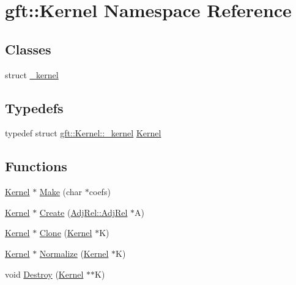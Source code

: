 \hypertarget{namespacegft_1_1Kernel}{\section{gft\-:\-:Kernel Namespace Reference}
\label{namespacegft_1_1Kernel}
}
\subsection*{Classes}
\begin{DoxyCompactItemize}
\item 
struct \hyperlink{structgft_1_1Kernel_1_1__kernel}{\-\_\-kernel}
\end{DoxyCompactItemize}
\subsection*{Typedefs}
\begin{DoxyCompactItemize}
\item 
typedef struct \hyperlink{structgft_1_1Kernel_1_1__kernel}{gft\-::\-Kernel\-::\-\_\-kernel} \hyperlink{namespacegft_1_1Kernel_a88f2f8f5778d1d17a52a77e1f2518ab3}{Kernel}
\end{DoxyCompactItemize}
\subsection*{Functions}
\begin{DoxyCompactItemize}
\item 
\hyperlink{namespacegft_1_1Kernel_a88f2f8f5778d1d17a52a77e1f2518ab3}{Kernel} $\ast$ \hyperlink{namespacegft_1_1Kernel_aaaf4b10ecdc7daf68da848e3b71168a0}{Make} (char $\ast$coefs)
\item 
\hyperlink{namespacegft_1_1Kernel_a88f2f8f5778d1d17a52a77e1f2518ab3}{Kernel} $\ast$ \hyperlink{namespacegft_1_1Kernel_a2a5aad45a71c7de42fe5880de93ed74d}{Create} (\hyperlink{namespacegft_1_1AdjRel_a832ff5521af7a9801ff18dc3ae629b68}{Adj\-Rel\-::\-Adj\-Rel} $\ast$A)
\item 
\hyperlink{namespacegft_1_1Kernel_a88f2f8f5778d1d17a52a77e1f2518ab3}{Kernel} $\ast$ \hyperlink{namespacegft_1_1Kernel_a5a68065e9cf77a017b28ad92f156d974}{Clone} (\hyperlink{namespacegft_1_1Kernel_a88f2f8f5778d1d17a52a77e1f2518ab3}{Kernel} $\ast$K)
\item 
\hyperlink{namespacegft_1_1Kernel_a88f2f8f5778d1d17a52a77e1f2518ab3}{Kernel} $\ast$ \hyperlink{namespacegft_1_1Kernel_a594ddb9f58c45c48f8219442853f1b27}{Normalize} (\hyperlink{namespacegft_1_1Kernel_a88f2f8f5778d1d17a52a77e1f2518ab3}{Kernel} $\ast$K)
\item 
void \hyperlink{namespacegft_1_1Kernel_affb90da6240851e656737925b21a4d26}{Destroy} (\hyperlink{namespacegft_1_1Kernel_a88f2f8f5778d1d17a52a77e1f2518ab3}{Kernel} $\ast$$\ast$K)
\end{DoxyCompactItemize}


